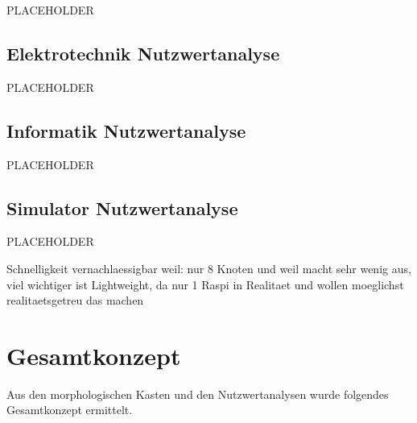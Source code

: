 PLACEHOLDER

\subsection{Elektrotechnik Nutzwertanalyse}

PLACEHOLDER

\subsection{Informatik Nutzwertanalyse}

PLACEHOLDER

\subsection{Simulator Nutzwertanalyse}

PLACEHOLDER

Schnelligkeit vernachlaessigbar weil: nur 8 Knoten und weil macht sehr wenig aus, viel wichtiger ist Lightweight, da nur 1 Raspi in Realitaet und wollen moeglichst realitaetsgetreu das machen

\newpage
\section{Gesamtkonzept}

Aus den morphologischen Kasten und den Nutzwertanalysen wurde folgendes Gesamtkonzept ermittelt. 

